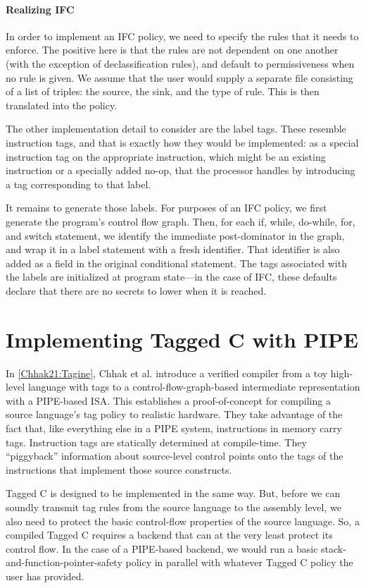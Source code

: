 \documentclass{llncs}
\begin{document}
\paragraph*{Realizing IFC}

In order to implement an IFC policy, we need to specify the rules that it needs to enforce.
The positive here is that the rules are not dependent on one another (with the exception of
declassification rules), and default to permissiveness when no rule is given. We assume that
the user would supply a separate file consisting of a list of triples: the source, the sink,
and the type of rule. This is then translated into the policy.

The other implementation detail to consider are the label tags. These resemble
instruction tags, and that is exactly how they would be implemented: as a special instruction
tag on the appropriate instruction, which might be an existing instruction or a specially
added no-op, that the processor handles by introducing a tag corresponding to that label.

It remains to generate those labels. For purposes of an IFC policy, we first generate the program's
control flow graph. Then, for each if, while, do-while, for, and switch statement, we identify the
immediate post-dominator in the graph, and wrap it in a label statement with a fresh identifier.
That identifier is also added as a field in the original conditional statement. The tags
associated with the labels are initialized at program state---in the case of IFC, these defaults
declare that there are no secrets to lower when it is reached.

\section{Implementing Tagged C with PIPE}
\label{sec:optionals}

In \cref{Chhak21:Tagine}, Chhak et al. introduce a verified compiler from a toy
high-level language with tags
to a control-flow-graph-based intermediate representation with a PIPE-based
ISA. This establishes a proof-of-concept for compiling a source language's tag policy to
realistic hardware. They take advantage of the fact that, like everything else in a PIPE system,
instructions in memory carry tags. Instruction tags are statically determined at compile-time.
They ``piggyback'' information about source-level control points onto the tags of the instructions
that implement those source constructs.

Tagged C is designed to be implemented in the same way. But, before we can soundly transmit
tag rules from the source language to the assembly level, we also need to protect the basic
control-flow properties of the source language. So, a compiled Tagged C requires a backend that
can at the very least protect its control flow. In the case of a PIPE-based backend, we would
run a basic stack-and-function-pointer-safety policy in parallel with whatever Tagged C policy
the user has provided.
\end{document}
